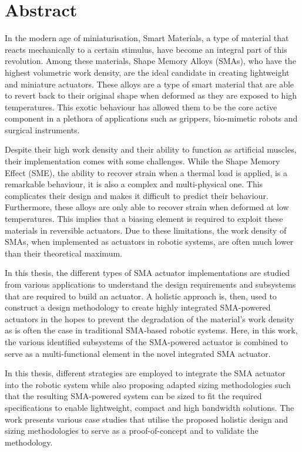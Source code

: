 

\cleardoublepage
\chapter*{Abstract}
In the modern age of miniaturisation, Smart Materials, a type of material that reacts mechanically to a certain stimulus, have become an integral part of this revolution. Among these materials, Shape Memory Alloys (SMAs), who have the highest volumetric work density, are the ideal candidate in creating lightweight and miniature actuators. These alloys are a type of smart material that are able to revert back to their original shape when deformed as they are exposed to high temperatures. This exotic behaviour has allowed them to be the core active component in a plethora of applications such as grippers, bio-mimetic robots and surgical instruments.

Despite their high work density and their ability to function as artificial muscles, their implementation comes with some challenges. While the Shape Memory Effect (SME), the ability to recover strain when a thermal load is applied, is a remarkable behaviour, it is also a complex and multi-physical one. This complicates their design and makes it difficult to predict their behaviour. Furthermore, these alloys are only able to recover strain when deformed at low temperatures. This implies that a biasing element is required to exploit these materials in reversible actuators. Due to these limitations, the work density of SMAs, when implemented as actuators in robotic systems, are often much lower than their theoretical maximum.

In this thesis, the different types of SMA actuator implementations are studied from various applications to understand the design requirements and subsystems that are required to build an actuator. A holistic approach is, then, used to construct a design methodology to create highly integrated SMA-powered actuators in the hopes to prevent the degradation of the material's work density as is often the case in traditional SMA-based robotic systems. Here, in this work, the various identified subsystems of the SMA-powered actuator is combined to serve as a multi-functional element in the novel integrated SMA actuator.

In this thesis, different strategies are employed to integrate the SMA actuator into the robotic system while also proposing adapted sizing methodologies such that the resulting SMA-powered system can be sized to fit the required specifications to enable lightweight, compact and high bandwidth solutions. The work presents various case studies that utilise the proposed holistic design and sizing methodologies to serve as a proof-of-concept and to validate the methodology.

